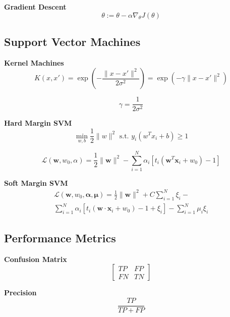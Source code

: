\documentclass[8pt]{article}
\begin{document}
\begin{multicols}{2}
\textbf{Gradient Descent}
\begin{equation}
    \theta := \theta - \alpha \nabla_{\theta} J(\theta)
\end{equation}

\subsection*{Support Vector Machines}
\textbf{Kernel Machines}
\begin{equation}
    K(x, x') = \exp(-\frac{\|x - x'\|^2}{2\sigma^2}) = \exp(-\gamma \|x - x'\|^2)
\end{equation}

\begin{equation}
    \gamma = \frac{1}{2\sigma^2}
\end{equation}

\textbf{Hard Margin SVM}
\begin{equation}
    \min_{w, b} \frac{1}{2} \|w\|^2 \text{ s.t. } y_i(w^Tx_i + b) \geq 1
\end{equation}

\begin{equation}
    \mathcal{L}(\mathbf{w}, w_0, \alpha) = \frac{1}{2} \|\mathbf{w}\|^2 - \sum_{i=1}^{N} \alpha_i[t_i(\mathbf{w}^T\mathbf{x}_i + w_0) - 1]
\end{equation}

\textbf{Soft Margin SVM}
\begin{multline}
    \mathcal{L}(\mathbf{w}, w_0, \mathbf{\alpha}, \mathbf{\mu}) = \frac{1}{2} \|\mathbf{w}\|^2 + C \sum_{i=1}^{N} \xi_i - \\
    \sum_{i=1}^{N} \alpha_i[t_i(\mathbf{w} \cdot \mathbf{x}_i + w_0) - 1 + \xi_i] - \sum_{i=1}^{N} \mu_i \xi_i
\end{multline}

\subsection*{Performance Metrics}
\textbf{Confusion Matrix}
\begin{equation}
    \begin{bmatrix}
        TP & FP \\
        FN & TN
    \end{bmatrix}
\end{equation}

\textbf{Precision}
\begin{equation}
    \frac{TP}{TP + FP}
\end{equation}


\end{multicols}
\end{document}
